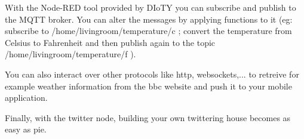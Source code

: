 \documentclass{myproc}
\begin{document}
\w With the Node-RED tool provided by DIoTY you can subscribe and publish to the MQTT broker.  You can alter the messages by applying functions to it (eg: subscribe to /home/livingroom/temperature/c ; convert the temperature from Celsius to Fahrenheit and then publish again to the topic /home/livingroom/temperature/f ). 

\w You can also interact over other protocols like http, websockets,... to retreive for example weather information from the bbc website and push it to your mobile application. 

\w Finally, with the twitter node, building your own twittering house becomes
as easy as pie.
\eit


\end{document}
